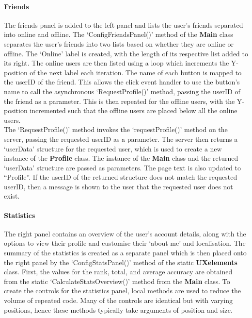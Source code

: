 \documentclass{article}
\begin{document}
\paragraph{Friends\\}

The friends panel is added to the left panel and lists the user's friends separated into online and offline. The `ConfigFriendsPanel()' method of the \textbf{Main} class separates the user's friends into two lists based on whether they are online or offline. The `Online' label is created, with the length of its respective list added to its right. The online users are then listed using a loop which increments the Y-position of the next label each iteration. The name of each button is mapped to the userID of the friend. This allows the click event handler to use the button's name to call the asynchronous `RequestProfile()' method, passing the userID of the friend as a parameter. This is then repeated for the offline users, with the Y-position incremented such that the offline users are placed below all the online users. \\

The `RequestProfile()' method invokes the `requestProfile()' method on the server, passing the requested userID as a parameter. The server then returns a `userData' structure for the requested user, which is used to create a new instance of the \textbf{Profile} class. The instance of the \textbf{Main} class and the returned `userData' structure are passed as parameters. The page text is also updated to ``Profile''. If the userID of the returned structure does not match the requested userID, then a message is shown to the user that the requested user does not exist.

\paragraph{Statistics\\}

The right panel contains an overview of the user's account details, along with the options to view their profile and customise their `about me' and localisation. The summary of the statistics is created as a separate panel which is then placed onto the right panel by the `ConfigStatsPanel()' method of the static \textbf{UXelements} class. First, the values for the rank, total, and average accuracy are obtained from the static `CalculateStatsOverview()' method from the \textbf{Main} class. To create the controls for the statistics panel, local methods are used to reduce the volume of repeated code. Many of the controls are identical but with varying positions, hence these methods typically take arguments of position and size. \\
\end{document}
